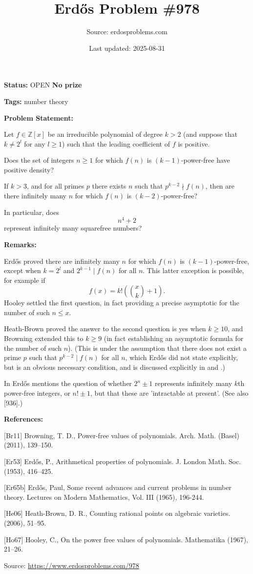\documentclass{article}
\title{Erd\H{o}s Problem \#978}
\date{Last updated: 2025-08-31}
\author{Source: erdosproblems.com}
\begin{document}
\maketitle

\noindent\textbf{Status:} OPEN \quad \textbf{No prize}

\noindent\textbf{Tags:} number theory

\medskip
\noindent\textbf{Problem Statement:}

Let $f\in \mathbb{Z}[x]$ be an irreducible polynomial of degree $k>2$ (and suppose that $k\neq 2^l$ for any $l\geq 1$) such that the leading coefficient of $f$ is positive.

Does the set of integers $n\geq 1$ for which $f(n)$ is $(k-1)$-power-free have positive density?

If $k>3$, and for all primes $p$ there exists $n$ such that $p^{k-2}\nmid f(n)$, then are there infinitely many $n$ for which $f(n)$ is $(k-2)$-power-free?

In particular, does\[n^4+2\]represent infinitely many squarefree numbers?

\bigskip
\noindent\textbf{Remarks:}

Erd\H{o}s \cite{Er53} proved there are infinitely many $n$ for which $f(n)$ is $(k-1)$-power-free, except when $k=2^l$ and $2^{k-1}\mid f(n)$ for all $n$. This latter exception is possible, for example if\[f(x)=k!\left(\binom{x}{k}+1\right).\]Hooley \cite{Ho67} settled the first question, in fact providing a precise asymptotic for the number of such $n\leq x$.

Heath-Brown \cite{He06} proved the answer to the second question is yes when $k\geq 10$, and Browning \cite{Br11} extended this to $k\geq 9$ (in fact establishing an asymptotic formula for the number of such $n$). (This is under the assumption that there does not exist a prime $p$ such that $p^{k-2}\mid f(n)$ for all $n$, which Erd\H{o}s did not state explicitly, but is an obvious necessary condition, and is discussed explicitly in \cite{He06} and \cite{Br11}.)

In \cite{Er65b} Erd\H{o}s mentions the question of whether $2^n\pm 1$ represents infinitely many $k$th power-free integers, or $n!\pm 1$, but that these are 'intractable at present'. (See also [936].)

\bigskip
\noindent\textbf{References:}

[Br11] Browning, T. D., Power-free values of polynomials. Arch. Math. (Basel) (2011), 139--150.
 
 [Er53] Erd\H{o}s, P., Arithmetical properties of polynomials. J. London Math. Soc. (1953), 416--425.
 
 [Er65b] Erd\H{o}s, Paul, Some recent advances and current problems in number theory. Lectures on Modern Mathematics, Vol. III (1965), 196-244.
 
 [He06] Heath-Brown, D. R., Counting rational points on algebraic varieties. (2006), 51--95.
 
 [Ho67] Hooley, C., On the power free values of polynomials. Mathematika (1967), 21--26.

\bigskip
\noindent\small{Source: \url{https://www.erdosproblems.com/978}}
\end{document}
